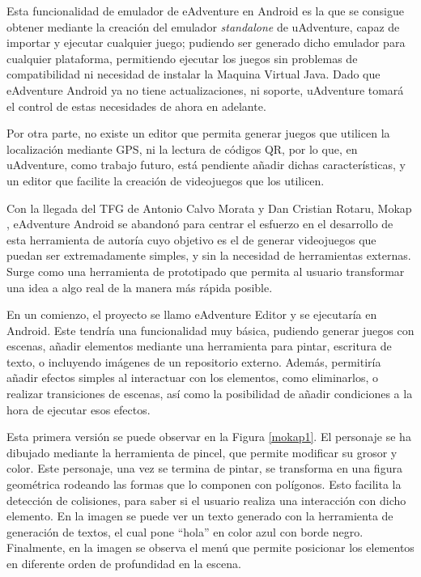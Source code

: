 Esta funcionalidad de emulador de eAdventure en Android es la que se consigue obtener mediante la creación del emulador \textit{standalone} de uAdventure, capaz de importar y ejecutar cualquier juego; pudiendo ser generado dicho emulador para cualquier plataforma, permitiendo ejecutar los juegos sin problemas de compatibilidad ni necesidad de instalar la Maquina Virtual Java. Dado que eAdventure Android ya no tiene actualizaciones, ni soporte, uAdventure tomará el control de estas necesidades de ahora en adelante.

Por otra parte, no existe un editor que permita generar juegos que utilicen la localización mediante GPS, ni la lectura de códigos QR, por lo que, en uAdventure, como trabajo futuro, está pendiente añadir dichas características, y un editor que facilite la creación de videojuegos que los utilicen. 

Con la llegada del TFG de Antonio Calvo Morata y Dan Cristian Rotaru, Mokap \cite{Torrente2015}, eAdventure Android se abandonó para centrar el esfuerzo en el desarrollo de esta herramienta de autoría cuyo objetivo es el de generar videojuegos que puedan ser extremadamente simples, y sin la necesidad de herramientas externas. Surge como una herramienta de prototipado que permita al usuario transformar una idea a algo real de la manera más rápida posible.

En un comienzo, el proyecto se llamo eAdventure Editor y se ejecutaría en Android. Este tendría una funcionalidad muy básica, pudiendo generar juegos con escenas, añadir elementos mediante una herramienta para pintar, escritura de texto, o incluyendo imágenes de un repositorio externo. Además, permitiría añadir efectos simples al interactuar con los elementos, como eliminarlos, o realizar transiciones de escenas, así como la posibilidad de añadir condiciones a la hora de ejecutar esos efectos.

Esta primera versión se puede observar en la Figura \ref{mokap1}. El personaje se ha dibujado mediante la herramienta de pincel, que permite modificar su grosor y color. Este personaje, una vez se termina de pintar, se transforma en una figura geométrica rodeando las formas que lo componen con polígonos. Esto facilita la detección de colisiones, para saber si el usuario realiza una interacción con dicho elemento. En la imagen se puede ver un texto generado con la herramienta de generación de textos, el cual pone ``hola'' en color azul con borde negro. Finalmente, en la imagen se observa el menú que permite posicionar los elementos en diferente orden de profundidad en la escena.

